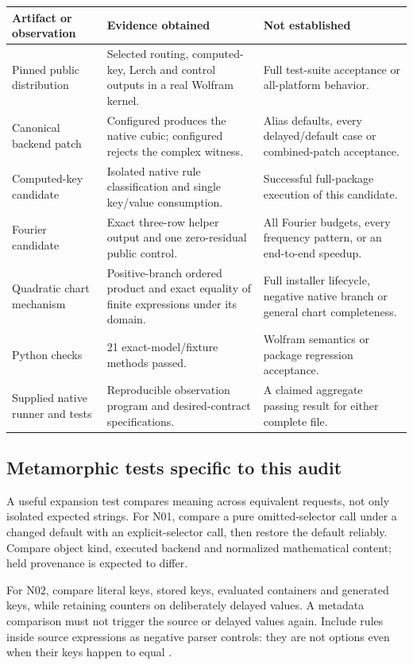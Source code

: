\documentclass[11pt,a4paper]{article}
\newcommand{\code}[1]{\texttt{\detokenize{#1}}}
\begin{document}
\begin{longtable}{L{32mm}L{71mm}L{43mm}}
\toprule
Artifact or observation & Evidence obtained & Not established\\\midrule\endhead
Pinned public distribution & Selected routing, computed-key, Lerch and control outputs in a real Wolfram kernel. & Full test-suite acceptance or all-platform behavior.\\
Canonical backend patch & Configured \code{Series} produces the native cubic; configured \code{Package} rejects the complex witness. & Alias defaults, every delayed/default case or combined-patch acceptance.\\
Computed-key candidate & Isolated native rule classification and single key/value consumption. & Successful full-package execution of this candidate.\\
Fourier candidate & Exact three-row helper output and one zero-residual public control. & All Fourier budgets, every frequency pattern, or an end-to-end speedup.\\
Quadratic chart mechanism & Positive-branch ordered product and exact equality of finite expressions under its domain. & Full installer lifecycle, negative native branch or general chart completeness.\\
Python checks & 21 exact-model/fixture methods passed. & Wolfram semantics or package regression acceptance.\\
Supplied native runner and tests & Reproducible observation program and desired-contract specifications. & A claimed aggregate passing result for either complete file.\\
\bottomrule
\end{longtable}

\subsection{Metamorphic tests specific to this audit}
A useful expansion test compares meaning across equivalent requests, not only isolated expected strings. For N01, compare a pure omitted-selector call under a changed default with an explicit-selector call, then restore the default reliably. Compare object kind, executed backend and normalized mathematical content; held provenance is expected to differ.

For N02, compare literal keys, stored keys, evaluated containers and generated keys, while retaining counters on deliberately delayed values. A metadata comparison must not trigger the source or delayed values again. Include rules inside source expressions as negative parser controls: they are not options even when their keys happen to equal \code{"Backend"}.
\end{document}
